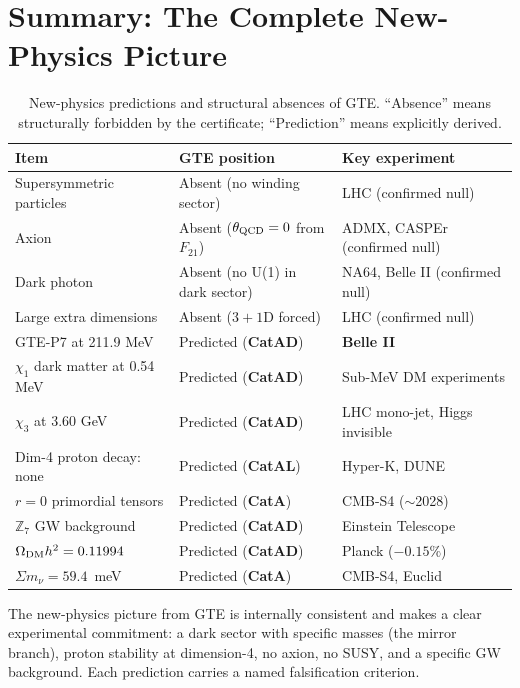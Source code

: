 \documentclass[11pt,a4paper]{article}
\newcommand{\CatAL}{\textbf{CatAL}}
\newcommand{\CatAD}{\textbf{CatAD}}
\newcommand{\CatA}{\textbf{CatA}}
\begin{document}
\section{Summary: The Complete New-Physics Picture}
\label{sec:summary}

\begin{table}[htbp]
\centering
\caption{New-physics predictions and structural absences of GTE.  ``Absence'' means
structurally forbidden by the certificate; ``Prediction'' means explicitly derived.}
\label{tab:newphys}
\setlength{\tabcolsep}{5pt}
\begin{tabular}{lp{5.0cm}p{4.2cm}}
\toprule
Item & GTE position & Key experiment \\
\midrule
Supersymmetric particles & Absent (no winding sector) & LHC (confirmed null) \\
Axion & Absent ($\theta_{\rm QCD}=0$ from $F_{21}$) & ADMX, CASPEr (confirmed null) \\
Dark photon & Absent (no U(1) in dark sector) & NA64, Belle II (confirmed null) \\
Large extra dimensions & Absent ($3{+}1$D forced) & LHC (confirmed null) \\
\midrule
GTE-P7 at 211.9 MeV & Predicted (\CatAD) & \textbf{Belle II} \\
$\chi_1$ dark matter at 0.54 MeV & Predicted (\CatAD) & Sub-MeV DM experiments \\
$\chi_3$ at 3.60 GeV & Predicted (\CatAD) & LHC mono-jet, Higgs invisible \\
Dim-4 proton decay: none & Predicted (\CatAL) & Hyper-K, DUNE \\
$r = 0$ primordial tensors & Predicted (\CatA) & CMB-S4 ($\sim$2028) \\
$\mathbb{Z}_7$ GW background & Predicted (\CatAD) & Einstein Telescope \\
$\Omega_{\rm DM} h^2 = 0.11994$ & Predicted (\CatAD) & Planck ($-0.15\%$) \\
$\Sigma m_\nu = 59.4$~meV & Predicted (\CatA) & CMB-S4, Euclid \\
\bottomrule
\end{tabular}
\end{table}

The new-physics picture from GTE is internally consistent and makes a clear
experimental commitment: a dark sector with specific masses (the mirror branch),
proton stability at dimension-4, no axion, no SUSY, and a specific GW background.
Each prediction carries a named falsification criterion.
\end{document}
